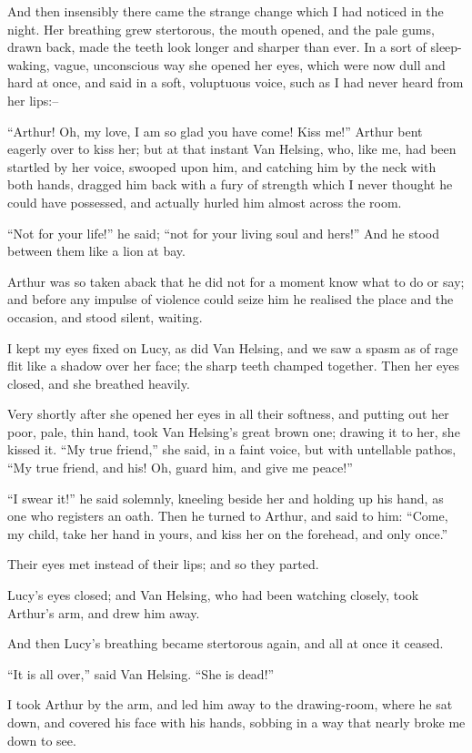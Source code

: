 \documentclass[12pt,openright]{book}
\begin{document}
And then insensibly there came the strange change which I had noticed in the night. Her breathing grew stertorous, the mouth opened, and the pale gums, drawn back, made the teeth look longer and sharper than ever. In a sort of sleep-waking, vague, unconscious way she opened her eyes, which were now dull and hard at once, and said in a soft, voluptuous voice, such as I had never heard from her lips:–

“Arthur! Oh, my love, I am so glad you have come! Kiss me!” Arthur bent eagerly over to kiss her; but at that instant Van Helsing, who, like me, had been startled by her voice, swooped upon him, and catching him by the neck with both hands, dragged him back with a fury of strength which I never thought he could have possessed, and actually hurled him almost across the room.

“Not for your life!” he said; “not for your living soul and hers!” And he stood between them like a lion at bay.

Arthur was so taken aback that he did not for a moment know what to do or say; and before any impulse of violence could seize him he realised the place and the occasion, and stood silent, waiting.

I kept my eyes fixed on Lucy, as did Van Helsing, and we saw a spasm as of rage flit like a shadow over her face; the sharp teeth champed together. Then her eyes closed, and she breathed heavily.

Very shortly after she opened her eyes in all their softness, and putting out her poor, pale, thin hand, took Van Helsing’s great brown one; drawing it to her, she kissed it. “My true friend,” she said, in a faint voice, but with untellable pathos, “My true friend, and his! Oh, guard him, and give me peace!”

“I swear it!” he said solemnly, kneeling beside her and holding up his hand, as one who registers an oath. Then he turned to Arthur, and said to him: “Come, my child, take her hand in yours, and kiss her on the forehead, and only once.”

Their eyes met instead of their lips; and so they parted.

Lucy’s eyes closed; and Van Helsing, who had been watching closely, took Arthur’s arm, and drew him away.

And then Lucy’s breathing became stertorous again, and all at once it ceased.

“It is all over,” said Van Helsing. “She is dead!”

I took Arthur by the arm, and led him away to the drawing-room, where he sat down, and covered his face with his hands, sobbing in a way that nearly broke me down to see.
\end{document}
